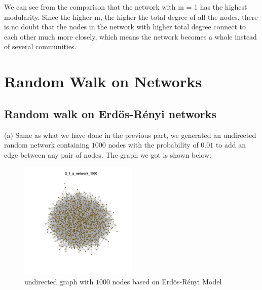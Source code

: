 \documentclass[draftcls,12pt,onecolumn]{IEEEtran}
\begin{document}
We can see from the comparison that the network with m = 1 has the highest modularity. Since the higher m, the higher the total degree of all the nodes, there is no doubt that the nodes in the network with higher total degree connect to each other much more closely, which means the network becomes a whole instead of several communities.


\section{Random Walk on Networks}
\subsection{Random walk on Erd\"os-R\'enyi networks}
(a) Same as what we have done in the previous part, we generated an undirected random network containing $1000$ nodes with the probability of $0.01$ to add an edge between any pair of nodes. The graph we got is shown below:
\begin{figure}[H]
\centering
\includegraphics[width=0.5\textwidth]{2_1_a_network_1000.png}
\caption{undirected graph with $1000$ nodes based on Erd\"os-R\'enyi Model}
\label{fig00}
\end{figure}
\end{document}

